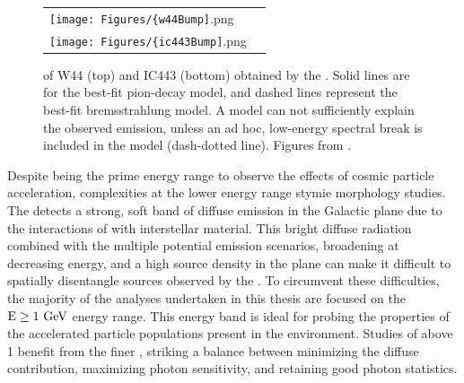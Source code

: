 \begin{figure}[h!]
	\begin{center}
		\begin{tabular}{ll}
			\texttt{[image: Figures/\{w44Bump]}.png} \\
			\texttt{[image: Figures/\{ic443Bump]}.png} \\
		\end{tabular}
	\end{center}
	\caption[\gam{} SEDs of SNRs W44 and IC443 obtained with the LAT]{\gam{} \seds{} of \snrs{} W44 (top) and IC443 (bottom) obtained by the \lat{}. Solid lines are for the best-fit pion-decay model, and dashed lines represent the best-fit bremsstrahlung model. A \brems{} model can not sufficiently explain the observed \gam{} emission, unless an ad hoc, low-energy spectral break is included in the \brems{} model (dash-dotted line). Figures from \cite{W44pion}.
		\label{fig:pionBump}
	}
\end{figure}

	







Despite being the prime energy range to observe the effects of cosmic particle acceleration, complexities at the lower \lat{} energy range stymie \snr{} morphology studies. The \lat{} detects a strong, soft band of diffuse emission in the Galactic plane due to the interactions of \crs{} with interstellar material. This bright diffuse radiation combined with the multiple potential emission scenarios, broadening \psf{} at decreasing energy, and a high source density in the plane can make it difficult to spatially disentangle sources observed by the \lat{}. To circumvent these 
difficulties, the majority of the analyses undertaken in this thesis are focused on the ${\rm E \geq 1~\mathrm{GeV}}$ energy range. This energy band is ideal for probing the properties of the accelerated particle populations present in the \snr{} environment. Studies of  \snrs{}  above 1\gev{} benefit from the finer \lat{} \psf{}, striking a balance between minimizing the diffuse contribution, maximizing photon sensitivity, and retaining good photon statistics.

